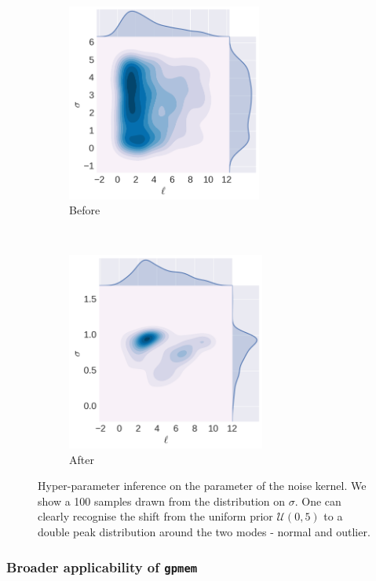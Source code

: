 \documentclass{article} %
\newcommand{\gpmem}{\texttt{gpmem}}
\begin{document}
\begin{figure}
        \centering
        \begin{subfigure}[b]{0.5\textwidth} \centering
                \includegraphics[height=6.5cm]{figs/neal_contour_l_vs_sigma_s__marginal_before.png}
                \caption{Before}
                \label{fig:before}
        \end{subfigure}%
        ~ %
        \begin{subfigure}[b]{0.5\textwidth} \centering
                \includegraphics[height=6.5cm]{figs/neal_contour_l_vs_sigma_s__marginal_after.png}
                \caption{After}
                \label{fig:after))}
        \end{subfigure}
        \caption{Hyper-parameter inference on the parameter of the noise kernel. We show a 100 samples drawn from the distribution on $\sigma$. One can clearly recognise the shift from the uniform prior $\mathcal{U}(0,5)$ to a double peak distribution around the two modes - normal and outlier.}\label{fig:inference}
\end{figure}

\subsubsection{Broader applicability of \gpmem}\label{sec:gpmem-broader}
\end{document}
